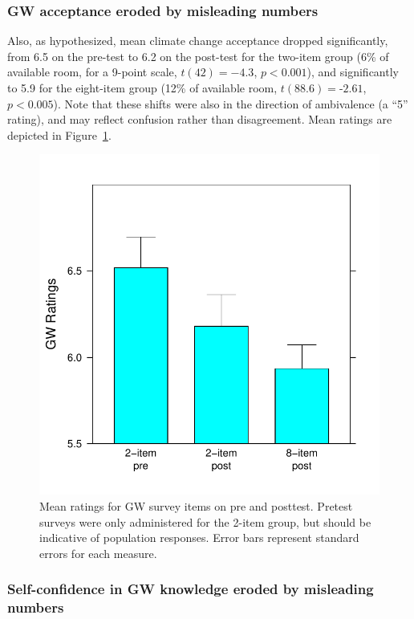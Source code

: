 \subsubsection{GW acceptance eroded by misleading numbers}

Also, as hypothesized, mean climate change acceptance dropped significantly,
from 6.5 on the pre-test to 6.2 on the post-test for the two-item group (6\% of
available room, for a 9-point scale, $t(42)=-4.3$, $p<0.001$), and significantly to
5.9 for the eight-item group (12\% of available room, $t(88.6)=‑2.61$, $p<0.005$).
Note that these shifts were also in the direction of ambivalence (a ``5''
rating), and may reflect confusion rather than disagreement. Mean ratings are
depicted in Figure~\ref{fig:evil-GW}.

\begin{figure}
    \centering
    \includegraphics{evil-GW.pdf}
    \caption{Mean ratings for GW survey items on pre and posttest. Pretest
        surveys were only administered for the 2-item group, but should be
        indicative of population responses. Error bars represent standard errors
        for each measure.}
    \label{fig:evil-GW}
\end{figure}

\subsubsection{Self-confidence in GW knowledge eroded by misleading numbers}


